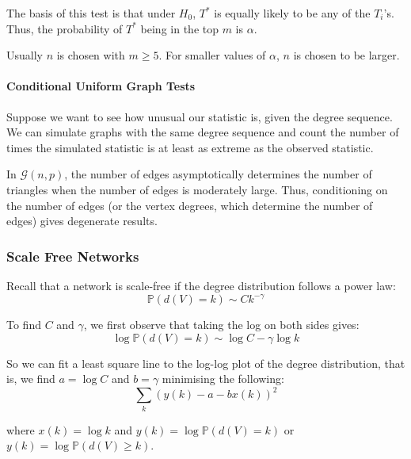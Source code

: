 \documentclass{article}
\begin{document}
The basis of this test is that under $H_0$, $T^*$ is equally likely to be any of the $T_i$'s. Thus, the probability of $T^*$ being in the top $m$ is $\alpha$. 

\begin{remark}
    Usually $n$ is chosen with $m\geq 5$. For smaller values of $\alpha$, $n$ is chosen to be larger.  
\end{remark}

\paragraph{Conditional Uniform Graph Tests} Suppose we want to see how unusual our statistic is, given the degree sequence. We can simulate graphs with the same degree sequence and count the number of times the simulated statistic is at least as extreme as the observed statistic.

\begin{remark}
    In $\mathcal{G}(n,p)$, the number of edges asymptotically determines
the number of triangles when the number of edges is moderately large. Thus,
conditioning on the number of edges (or the vertex degrees, which determine
the number of edges) gives degenerate results.
\end{remark}

\subsubsection{Scale Free Networks}
Recall that a network is scale-free if the degree distribution follows a power law:
\begin{equation*}
    \mathbb{P}(d(V)=k)\sim C k^{-\gamma}
\end{equation*}

To find $C$ and $\gamma$, we first observe that taking the log on both sides gives:
\begin{equation*}
    \log \mathbb{P}(d(V)=k)\sim \log C - \gamma \log k
\end{equation*}

So we can fit a least square line to the log-log plot of the degree distribution, that is, we find  $a=\log C$ and $b=\gamma$ minimising the following:
\begin{equation*}
    \sum_k (y(k)-a-b x(k))^{2}
\end{equation*}

where $x(k)=\log k$ and $y(k)=\log \mathbb{P}(d(V)=k)$ or $y(k)=\log \mathbb{P}(d(V)\geq k)$.
\end{document}
